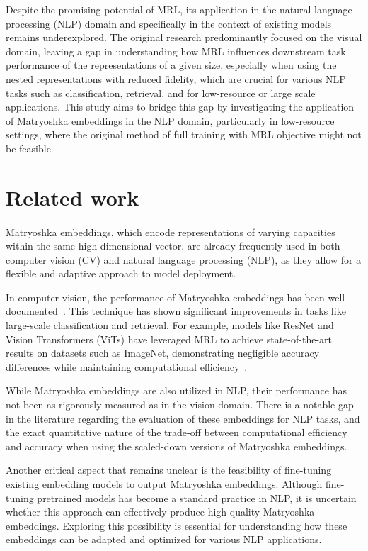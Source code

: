 \documentclass[12pt]{article}
\begin{document}
Despite the promising potential of MRL, its application in the natural language processing (NLP) domain and specifically in the context of existing models remains underexplored. The original research predominantly focused on the visual domain, leaving a gap in understanding how MRL influences downstream task performance of the representations of a given size, especially when using the nested representations with reduced fidelity, which are crucial for various NLP tasks such as classification, retrieval, and for low-resource or large scale applications. This study aims to bridge this gap by investigating the application of Matryoshka embeddings in the NLP domain, particularly in low-resource settings, where the original method of full training with MRL objective might not be feasible.

\section{Related work}

\paragraph{}
Matryoshka embeddings, which encode representations of varying capacities within the same high-dimensional vector, are already frequently used in both computer vision (CV) and natural language processing (NLP), as they allow for a flexible and adaptive approach to model deployment.

In computer vision, the performance of Matryoshka embeddings has been well documented~\cite{NEURIPS2022_c32319f4}. This technique has shown significant improvements in tasks like large-scale classification and retrieval. For example, models like ResNet and Vision Transformers (ViTs) have leveraged MRL to achieve state-of-the-art results on datasets such as ImageNet, demonstrating negligible accuracy differences while maintaining computational efficiency~\cite{NEURIPS2022_c32319f4}.

While Matryoshka embeddings are also utilized in NLP, their performance has not been as rigorously measured as in the vision domain. There is a notable gap in the literature regarding the evaluation of these embeddings for NLP tasks, and the exact quantitative nature of the trade-off between computational efficiency and accuracy when using the scaled-down versions of Matryoshka embeddings.

Another critical aspect that remains unclear is the feasibility of fine-tuning existing embedding models to output Matryoshka embeddings. Although fine-tuning pretrained models has become a standard practice in NLP, it is uncertain whether this approach can effectively produce high-quality Matryoshka embeddings. Exploring this possibility is essential for understanding how these embeddings can be adapted and optimized for various NLP applications.
\end{document}
